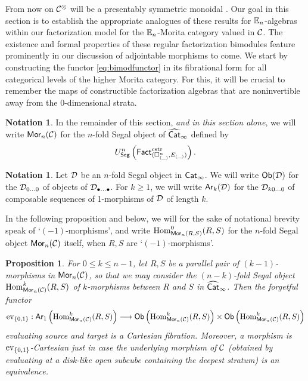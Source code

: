 \documentclass[10pt, reqno, twoside
, final
]{amsart}
\numberwithin{equation}{subsection}%
\theoremstyle{definition}
\theoremstyle{definition}
\theoremstyle{definition}
\newtheorem{nota}[defn]{Notation}
\theoremstyle{definition}
\theoremstyle{definition}
\theoremstyle{definition}
\theoremstyle{definition}
\theoremstyle{definition}
\theoremstyle{definition}
\theoremstyle{plain}
\theoremstyle{definition}
\theoremstyle{plain}
\theoremstyle{definition}
\theoremstyle{plain}
\theoremstyle{definition}
\theoremstyle{definition}
\theoremstyle{plain}
\theoremstyle{plain}
\theoremstyle{definition}
\theoremstyle{plain}
\theoremstyle{plain}
\newtheorem{prop}[defn]{Proposition}
\theoremstyle{plain}
\begin{document}
From now on $\mathcal{C}^{\otimes}$ will be a presentably symmetric monoidal \infcatt. Our goal in this section is to establish the appropriate analogues of these results for $\mathbb{E}_n$-algebras within our factorization model for the $\mathbb{E}_n$-Morita category valued in $\mathcal{C}$. The existence and formal properties of these regular factorization bimodules feature prominently in our discussion of adjointable morphisms to come. We start by constructing the functor \eqref{eq:bimodfunctor} in its fibrational form for all categorical levels of the higher Morita category. For this, it will be crucial to remember the maps of constructible factorization algebras that are noninvertible away from the 0-dimensional strata.
\begin{nota}
In the remainder of this section, \emph{and in this section alone}, we will write $\mathsf{Mor}_n(\mathcal{C})$ for the $n$-fold Segal object of $\widehat{\mathsf{Cat}}_{\infty}$ defined by
\[ U^n_{\mathsf{Seg}}\left(\mathsf{Fact}^{\mathrm{cstr}}_{(\square^n_{(\_)},E_{(\_)})}\right).  \]
\end{nota}
\begin{nota}
Let $\mathcal{D}$ be an $n$-fold Segal object in $\mathsf{Cat}_{\infty}$. We will write $\mathsf{Ob}(\mathcal{D})$ for the \infcat $\mathcal{D}_{0\ldots 0}$ of objects of $\mathcal{D}_{\bullet\ldots\bullet}$. For $k\geq 1$, we will write $\mathsf{Ar}_k(\mathcal{D})$ for the \infcat $\mathcal{D}_{k0\ldots 0}$ of composable sequences of 1-morphisms of $\mathcal{D}$ of length $k$.
\end{nota}
In the following proposition and below, we will for the sake of notational brevity speak of `$(-1)$-morphisms', and write $\mathrm{Hom}^0_{\mathsf{Mor}_n(R,S)}(R,S)$ for the $n$-fold Segal object $\mathsf{Mor}_{n}(\mathcal{C})$ itself, when $R,S$ are `$(-1)$-morphisms'. 
\begin{prop}\label{prop:sourcetargetCartesian}
For $0\leq k\leq n-1$, let $R,S$ be a parallel pair of $(k-1)$-morphisms in $\mathsf{Mor}_n(\mathcal{C})$, so that we may consider the $(n-k)$-fold Segal object $\mathrm{Hom}^k_{\mathsf{Mor}_n(\mathcal{C})}(R,S)$ of $k$-morphisms between $R$ and $S$ in $\widehat{\mathsf{Cat}}_{\infty}$. Then the forgetful functor 
\[   \mathrm{ev}_{\{0,1\}}:\mathsf{Ar}_1\left(\mathrm{Hom}^k_{\mathsf{Mor}_n(\mathcal{C})}(R,S)\right)\longrightarrow \mathsf{Ob}\left(\mathrm{Hom}^k_{\mathsf{Mor}_n(\mathcal{C})}(R,S)\right)\times \mathsf{Ob}\left(\mathrm{Hom}^k_{\mathsf{Mor}_n(\mathcal{C})}(R,S)\right) \]
evaluating source and target is a Cartesian fibration. Moreover, a morphism is $ \mathrm{ev}_{\{0,1\}}$-Cartesian just in case the underlying morphism of $\mathcal{C}$ (obtained by evaluating at a disk-like open subcube containing the deepest stratum) is an equivalence.
\end{prop}
\end{document}
